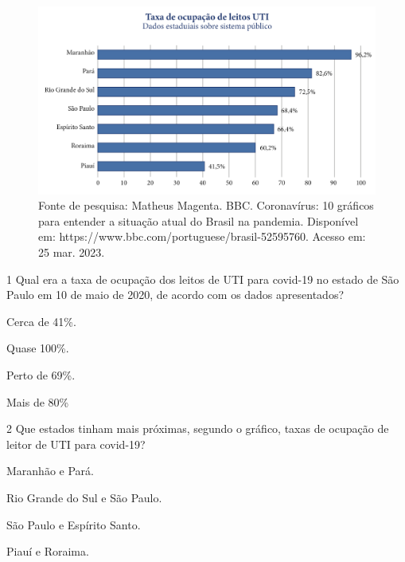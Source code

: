 \begin{figure}[htpb!]
\includegraphics[width=\textwidth]{../ilustracoes/POR5/SAEB_5ANO_POR_FIGURA5.png}
\caption{Fonte de pesquisa: Matheus Magenta. BBC. Coronavírus: 10 gráficos para entender a situação atual do Brasil na pandemia. Disponível em: https://www.bbc.com/portuguese/brasil-52595760. Acesso em: 25 mar. 2023.}
\end{figure}

\num{1} Qual era a taxa de ocupação dos leitos de UTI para covid-19 no estado de São
Paulo em 10 de maio de 2020, de acordo com os dados apresentados?

\begin{minipage}{.5\textwidth}
\begin{escolha}
\item Cerca de 41\%.

\item Quase 100\%.

\item Perto de 69\%.

\item Mais de 80\%
\end{escolha}
\end{minipage}


\num{2} Que estados tinham mais próximas, segundo o gráfico, taxas de ocupação de leitor de UTI para covid-19?

\begin{minipage}{.5\textwidth}
\begin{escolha}
\item Maranhão e Pará.

\item Rio Grande do Sul e São Paulo.

\item São Paulo e Espírito Santo.

\item Piauí e Roraima.
\end{escolha}
\end{minipage}

